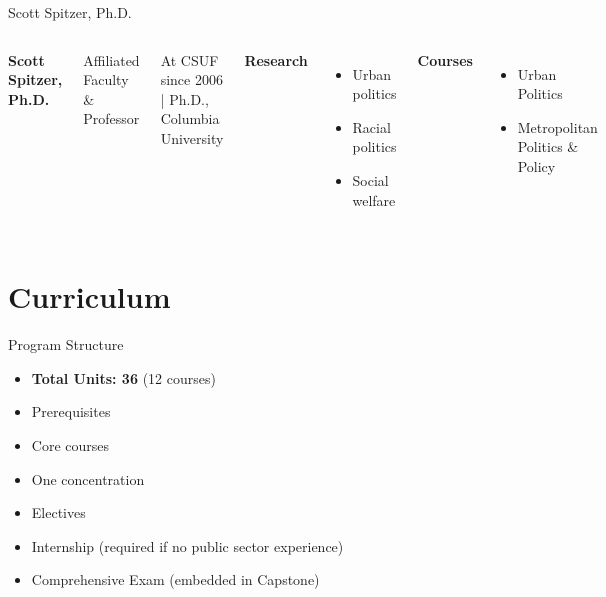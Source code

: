 \documentclass[10pt,aspectratio=169]{beamer}
\begin{document}
\begin{frame}{Scott Spitzer, Ph.D.}
\begin{columns}[T,onlytextwidth]
    \raggedright
    {\large\bfseries Scott Spitzer, Ph.D.}\par
    {Affiliated Faculty \& Professor}\par
    {\footnotesize At CSUF since 2006 \quad | \quad Ph.D., Columbia University}\par\vspace{0.4em}

    \textbf{Research}
    \begin{itemize}
      \item Urban politics
      \item Racial politics
      \item Social welfare
    \end{itemize}

    \textbf{Courses}
    \begin{itemize}
      \item Urban Politics
      \item Metropolitan Politics \& Policy
    \end{itemize}

    \vspace*{0.25cm}
\end{columns}
\end{frame}

\section{\textcolor{titanorange}{Curriculum}}

\begin{frame}{Program Structure}
\begin{Large}
\begin{itemize}
  \item \textbf{Total Units: 36} (12 courses)
  \item Prerequisites
  \item Core courses
  \item One concentration
  \item Electives
  \item Internship (required if no public sector experience)
  \item Comprehensive Exam (embedded in Capstone)
\end{itemize}
\end{Large}
\end{frame}
\end{document}
